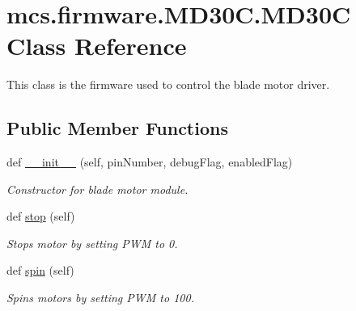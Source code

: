 \hypertarget{classmcs_1_1firmware_1_1MD30C_1_1MD30C}{}\section{mcs.\+firmware.\+M\+D30\+C.\+M\+D30C Class Reference}
\label{classmcs_1_1firmware_1_1MD30C_1_1MD30C}


This class is the firmware used to control the blade motor driver.  


\subsection*{Public Member Functions}
\begin{DoxyCompactItemize}
\item 
def \hyperlink{classmcs_1_1firmware_1_1MD30C_1_1MD30C_ab908f94d44d3aece7bdd5468e7845874}{\+\_\+\+\_\+init\+\_\+\+\_\+} (self, pin\+Number, debug\+Flag, enabled\+Flag)
\begin{DoxyCompactList}\small\item\em Constructor for blade motor module. \end{DoxyCompactList}\item 
\mbox{\label{classmcs_1_1firmware_1_1MD30C_1_1MD30C_af67e86025e7dda96f16dae3c5b43d70f}} 
def \hyperlink{classmcs_1_1firmware_1_1MD30C_1_1MD30C_af67e86025e7dda96f16dae3c5b43d70f}{stop} (self)
\begin{DoxyCompactList}\small\item\em Stops motor by setting P\+WM to 0. \end{DoxyCompactList}\item 
\mbox{\label{classmcs_1_1firmware_1_1MD30C_1_1MD30C_a1fb1cef98d92200cf1ac03e7860af083}} 
def \hyperlink{classmcs_1_1firmware_1_1MD30C_1_1MD30C_a1fb1cef98d92200cf1ac03e7860af083}{spin} (self)
\begin{DoxyCompactList}\small\item\em Spins motors by setting P\+WM to 100. \end{DoxyCompactList}\end{DoxyCompactItemize}
